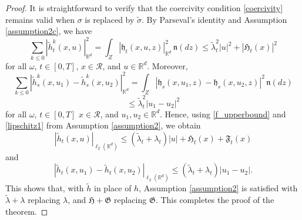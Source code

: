 \documentclass[11pt,reqno]{amsart}
\theoremstyle{definition}
\theoremstyle{remark}
\newcommand\bR{\mathbb{R}}
\newcommand\frh{\mathfrak{h}}
\newcommand\frF{\mathfrak{F}}
\newcommand\frH{\mathfrak{H}}
\newcommand\frG{\mathfrak{G}}
\newcommand\frn{\mathfrak{n}}
\newcommand\cR{\mathcal{R}}
\newcommand{\<}{\langle}
\renewcommand{\>}{\rangle}
\begin{document}
\begin{proof}
It is straightforward to verify that the coercivity condition \eqref{coercivity} remains valid when $\sigma$ is replaced by $\tilde\sigma$. 
By Parseval's identity and Assumption \ref{assumption2c}, 
we have 
$$
 \sum_{k\leq0}|\tilde h^k_t(x,u)|_{\bR^d}^2=\int_{Z}|\frh_t(x,u,z)|^2_{\bR^d}\,\frn(dz)
 \leq \tilde\lambda_t^2|u|^2+|\frH_t(x)|^2
$$
for all $\omega$, $t\in[0,T]$, $x\in\cR$, and $u\in\bR^d$. Moreover, 
$$
\sum_{k\leq0}|\tilde h^k_s(x,u_1)-\tilde h^k_s(x,u_2)|^2_{\bR^d}
=\int_{Z}|\frh_s(x,u_1,z)-\frh_s(x,u_2,z)|^2\,\frn(dz)
$$
$$
\leq \tilde\lambda_t^2|u_1-u_2|^2 
$$
for all $\omega$, $t\in[0,T]$ $x\in\cR$, and $u_1, u_2\in\bR^d$.  
Hence, using \eqref{f_upperbound} and \eqref{lipschitz1} 
from  Assumption \ref{assumption2},  
we obtain 
$$
|\tilde h_t(x,u)|_{\ell_2(\bR^d)}
\leq  (\tilde\lambda_t+\lambda_t)|u|+\frH_t(x)+\frF_t(x)
$$
and 
$$
|\tilde h_t(x,u_1)-\tilde h_t(x,u_2)|_{\ell_2(\bR^d)}
\leq  (\tilde\lambda_t+\lambda_t)|u_1-u_2|. 
$$
This shows that, with $\tilde h$ in place of $h$,  
Assumption \ref{assumption2} is satisfied with 
$\tilde\lambda+\lambda$ replacing $\lambda$, and 
$\frH+\frG$ replacing $\frG$. This completes the proof 
of the theorem.  
\end{proof}
\end{document}
